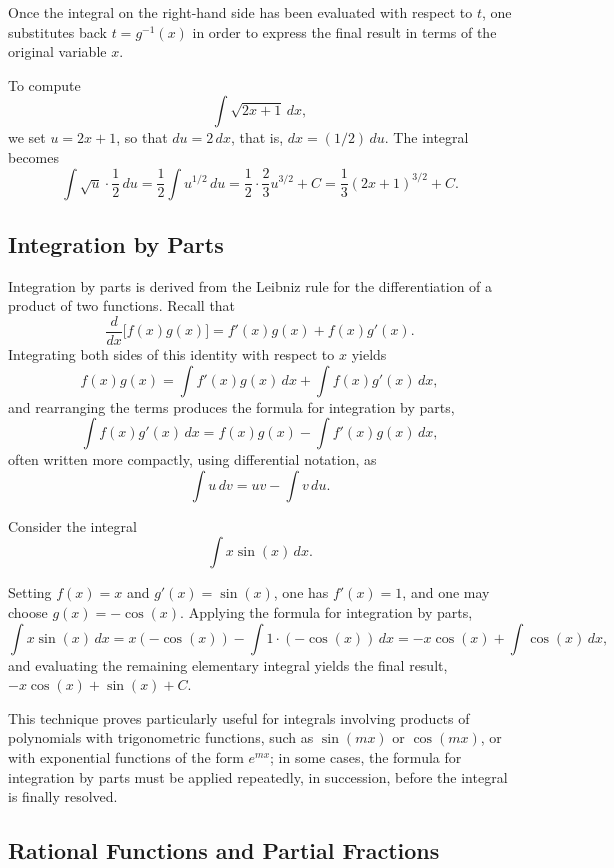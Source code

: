Once the integral on the right-hand side has been evaluated with respect to $t$, one substitutes back $t = g^{-1}(x)$ in order to express the final result in terms of the original variable $x$.

\begin{example}
To compute \[
\int \sqrt{2x+1} \, dx,
\] we set $u = 2x+1$, so that $du = 2 \, dx$, that is, $dx = (1/2) \, du$. The integral becomes
\[
\int \sqrt{u} \cdot \frac{1}{2} \, du = \frac{1}{2} \int u^{1/2} \, du = \frac{1}{2} \cdot \frac{2}{3} u^{3/2} + C = \frac{1}{3} (2x+1)^{3/2} + C.
\]

\end{example}

\subsection{Integration by Parts}

Integration by parts is derived from the Leibniz rule for the differentiation of a product of two functions. Recall that
\[
\frac{d}{dx} \big[ f(x) g(x) \big] = f'(x) g(x) + f(x) g'(x).
\]
Integrating both sides of this identity with respect to $x$ yields
\[
f(x) g(x) = \int f'(x) g(x) \, dx + \int f(x) g'(x) \, dx,
\]
and rearranging the terms produces the formula for integration by parts,
\[
\int f(x) g'(x) \, dx = f(x) g(x) - \int f'(x) g(x) \, dx,
\]
often written more compactly, using differential notation, as
\[
\int u \, dv = uv - \int v \, du.
\]

\begin{example}
Consider the integral
\[
\int x \sin(x) \, dx.
\]

Setting $f(x) = x$ and $g'(x) = \sin(x)$, one has $f'(x) = 1$, and one may choose $g(x) = -\cos(x)$. Applying the formula for integration by parts, \[
\int x \sin(x) \, dx = x(-\cos(x)) - \int 1 \cdot (-\cos(x)) \, dx = -x\cos(x) + \int \cos(x) \, dx,
\] and evaluating the remaining elementary integral yields the final result, $-x\cos(x) + \sin(x) + C$.
\end{example}

This technique proves particularly useful for integrals involving products of polynomials with trigonometric functions, such as $\sin(mx)$ or $\cos(mx)$, or with exponential functions of the form $e^{mx}$; in some cases, the formula for integration by parts must be applied repeatedly, in succession, before the integral is finally resolved.

\subsection{Rational Functions and Partial Fractions}

